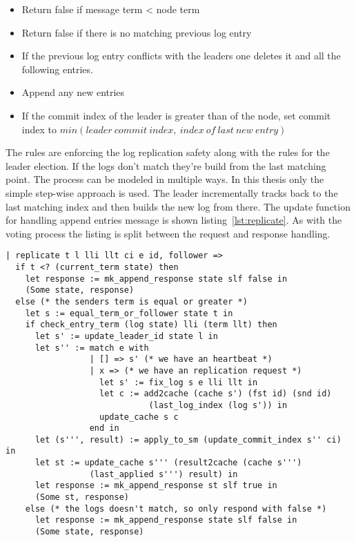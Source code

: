 \begin{itemize}
  \item Return false if message term < node term
  \item Return false if there is no matching previous log entry
  \item If the previous log entry conflicts with the leaders one
    deletes it and all the following entries.
  \item Append any new entries
  \item If the commit index of the leader is greater than of the node,
    set commit index to $min(leader\ commit\ index,\ index\ of\ last\ new\ entry)$
\end{itemize}

The rules are enforcing the log replication safety along with the
rules for the leader election. If the logs don't match they're
build from the last matching point. The process can be modeled
in multiple ways. In this thesis only the simple step-wise approach is
used. The leader incrementally tracks back to the last matching index
and then builds the new log from there. The update function for
handling append entries message is shown listing~\ref{lst:replicate}.
As with the voting process the listing is split between the request and
response handling.

\begin{lstlisting}[style=coq,label=lst:replicate,
caption=Handle incoming replication requests as a follower.]
| replicate t l lli llt ci e id, follower =>
  if t <? (current_term state) then
    let response := mk_append_response state slf false in
    (Some state, response)
  else (* the senders term is equal or greater *)
    let s := equal_term_or_follower state t in
    if check_entry_term (log state) lli (term llt) then
      let s' := update_leader_id state l in
      let s'' := match e with
                 | [] => s' (* we have an heartbeat *)
                 | x => (* we have an replication request *)
                   let s' := fix_log s e lli llt in
                   let c := add2cache (cache s') (fst id) (snd id)
                             (last_log_index (log s')) in
                   update_cache s c
                 end in
      let (s''', result) := apply_to_sm (update_commit_index s'' ci) in
      let st := update_cache s''' (result2cache (cache s''')
                 (last_applied s''') result) in
      let response := mk_append_response st slf true in
      (Some st, response)
    else (* the logs doesn't match, so only respond with false *)
      let response := mk_append_response state slf false in
      (Some state, response)
\end{lstlisting}

